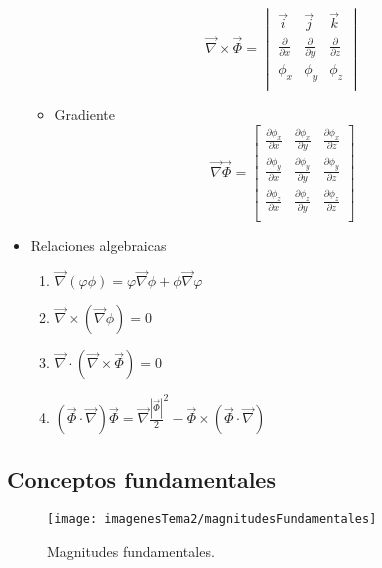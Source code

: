 \begin{itemize}
\begin{itemize}
		\[
		\vec\nabla \times \vec\Phi = \begin{vmatrix}
			\vec i & \vec j & \vec k \\
			\frac{\partial}{\partial x} & \frac{\partial}{\partial y} & \frac{\partial}{\partial z} \\
			\phi_x & \phi_y & \phi_z \\
		\end{vmatrix}
		\]
		\item Gradiente 
		\setlength{\arraycolsep}{1.5pt}
		\renewcommand{\arraystretch}{1.5}
		\[\vec\nabla  \vec\Phi = \begin{bmatrix}
			\frac{\partial \phi_x}{\partial x} & \frac{\partial \phi_x}{\partial y} & \frac{\partial \phi_x}{\partial z} \\
			\frac{\partial \phi_y}{\partial x} & \frac{\partial \phi_y}{\partial y} & \frac{\partial \phi_y}{\partial z} \\
			\frac{\partial \phi_z}{\partial x} & \frac{\partial \phi_z}{\partial y} & \frac{\partial \phi_z}{\partial z} \\
		\end{bmatrix}\]
		
	\end{itemize}
	\item Relaciones algebraicas
	\begin{enumerate}
		\item $\vec{\nabla}(\varphi \phi) =\varphi\vec{\nabla}\phi+\phi\vec{\nabla}\varphi$
		\item $\vec{\nabla} \times \left(\vec{\nabla} \phi\right)=0$
		\item $\vec{\nabla} \cdot \left(\vec{\nabla} \times \vec{\Phi}\right) =0$
		\item $\left(\vec{\Phi}  \cdot \vec{\nabla}\right)\vec{\Phi}=\vec{\nabla} \frac{\left|\vec\Phi \right|}{2}^2-\vec\Phi \times \left(\vec{\Phi}  \cdot \vec{\nabla}\right) $ 
	\end{enumerate}
\end{itemize}

\subsection{Conceptos fundamentales}
\begin{figure}[H]
	\centering
	\texttt{[image: imagenesTema2/magnitudesFundamentales]}
	\caption{Magnitudes fundamentales.}
	\label{fig:magnitudesfundamentales}
\end{figure}

